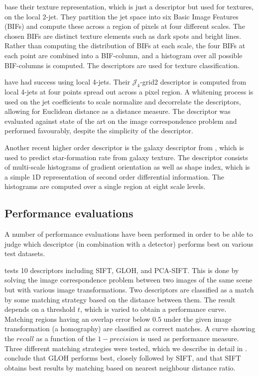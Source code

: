 \documentclass[thesis.tex]{subfiles}
\begin{document}
\citet{crosier2010using} base their texture representation, which is just a descriptor but used for textures, on the local $2$-jet. They partition the jet space into six Basic Image Features (BIFs) and compute these across a region of pixels at four different scales. The chosen BIFs are distinct texture elements such as dark spots and bright lines. Rather than computing the distribution of BIFs at each scale, the four BIFs at each point are combined into a BIF-column, and a histogram over all possible BIF-columns is computed. The descriptors are used for texture classification.

\citet{larsen2012jet} have had success using local 4-jets. Their $\mathcal{J}_4$-grid2 descriptor is computed from local 4-jets at four points spread out across a pixel region. A whitening process is used on the jet coefficients to scale normalize and decorrelate the descriptors, allowing for Euclidean distance as a distance measure. The descriptor was evaluated against state of the art on the image correspondence problem and performed favourably, despite the simplicity of the descriptor.

Another recent higher order descriptor is the galaxy descriptor from \citet{pedersen2013shape}, which is used to predict star-formation rate from galaxy texture. The descriptor consists of multi-scale histograms of gradient orientation as well as shape index, which is a simple 1D representation of second order differential information. The histograms are computed over a single region at eight scale levels.

\subsection{Performance evaluations}
A number of performance evaluations have been performed in order to be able to judge which descriptor (in combination with a detector) performs best on various test datasets.

\citet{mikolajczyk2005performance} tests 10 descriptors including SIFT, GLOH, and PCA-SIFT. This is done by solving the image correspondence problem between two images of the same scene but with various image transformations. Two descriptors are classified as a match by some matching strategy based on the distance between them. The result depends on a threshold $t$, which is varied to obtain a performance curve. Matching regions having an overlap error below $0.5$ under the given image transformation (a homography) are classified as correct matches. A curve showing the $recall$ as a function of the $1-precision$ is used as performance measure. Three different matching strategies were tested, which we describe in detail in . \citet{mikolajczyk2005performance} conclude that GLOH performs best, closely followed by SIFT, and that SIFT obtains best results by matching based on nearest neighbour distance ratio.
\end{document}
